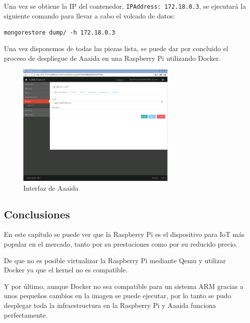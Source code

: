 Una vez se obtiene la IP del contenedor, \texttt{IPAddress: 172.18.0.3}, se ejecutará la siguiente comando para llevar a cabo el volcado de datos:

\begin{center}
\texttt{mongorestore dump/ -h 172.18.0.3}
\end{center}

Una vez disponemos de todas las piezas lista, se puede dar por concluido el proceso de despliegue de Aaaida en una Raspberry Pi utilizando Docker. 

\begin{figure}[htb]
\begin{center}
\includegraphics[width=0.70\textwidth]{./setup/aaaidaCoIoTe}
\caption{Interfaz de Aaaida}
\label{aidaCoI:aaaidaCoiote}
\end{center}
\end{figure} 
 
 \subsection{Conclusiones} 
 
En este capítulo se puede ver que la Raspberry Pi es el dispositivo para IoT más popular en el mercado, tanto por su prestaciones como por su reducido precio.
 
De que no es posible virtualizar la Raspberry Pi mediante Qemu y utilizar Docker ya que el kernel no es compatible. 

Y por último, aunque Docker no sea compatible para un sistema ARM gracias a unos pequeños cambios en la imagen se puede ejecutar, por lo tanto se pudo desplegar toda la infraestructura en la Raspberry Pi y Aaaida funciona perfectamente. 